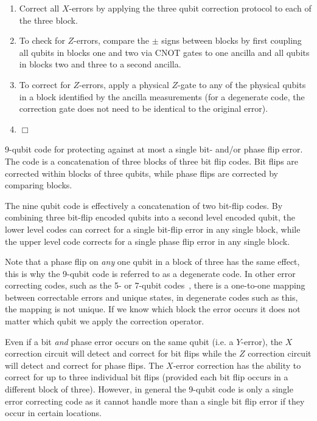 \begin{table}[!htbp]
\begin{mdframed}[innertopmargin=3pt, innerbottommargin=3pt, nobreak]
{\begin{enumerate}
\begin{align}
&= \frac{\alpha}{\sqrt{8}}(\ket{000}+\ket{111})(\ket{000}+\ket{111})(\ket{000}-\ket{111}) \nonumber \\
& + \frac{\beta}{\sqrt{8}}(\ket{000}-\ket{111})(\ket{000}-\ket{111})(\ket{000}+\ket{111}).
\end{align}
\item Correct all $X$-errors by applying the three qubit correction protocol to each of the three block.
\item To check for $Z$-errors, compare the $\pm$ signs between blocks by first coupling all qubits in 
blocks one and two via CNOT gates to one ancilla and all qubits in blocks two and three to a second ancilla.
\item To correct for $Z$-errors, apply a physical $Z$-gate to any of the physical qubits in a block identified by the 
ancilla measurements (for a degenerate code, the correction gate does not need to be identical to the original error).
\item $\Box$
\end{enumerate}}
\end{mdframed}
\captionspacealg \caption{9-qubit code for protecting against at most a single bit- and/or phase flip error. The code is a concatenation of three blocks of three bit flip codes.  Bit flips are corrected within blocks of three qubits, while phase flips are corrected by comparing blocks.} \label{alg:nine_QEC}
\end{table}

The nine qubit code is effectively a concatenation of two bit-flip codes. By combining three bit-flip encoded qubits into a 
second level encoded qubit, the lower level codes can correct for a single bit-flip error in any single block, while the 
upper level code corrects for a single phase flip error in any single block. 

Note that a phase flip on {\em any} one qubit in a block of three has the same effect, this is why the 9-qubit 
code is referred to as a degenerate code.  In other error correcting codes, such as the 5- or 7-qubit codes~\cite{bib:S96,bib:LMPZ96}, there is a one-to-one 
mapping between correctable errors and unique states, in degenerate codes such as this, the mapping is not unique.  If we know which block the error occurs it does not matter which qubit we apply the correction operator.  

Even if a bit {\em and} phase error occurs on the same qubit (i.e. a $Y$-error), the $X$ correction circuit will detect and correct for 
bit flips while the $Z$ correction circuit will detect and correct for phase flips.  The $X$-error correction 
has the ability to correct for up to three individual bit flips (provided each bit flip occurs in a different block of three).  However, in general 
the 9-qubit code is only a single error correcting code as it cannot handle more than a single bit flip error if they occur in certain locations.

